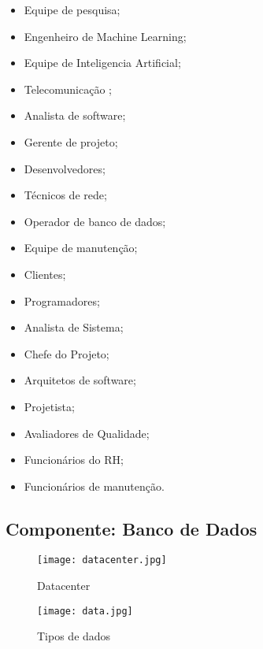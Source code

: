 \begin{itemize}

       \item Equipe de pesquisa;
       \item Engenheiro de Machine Learning;
       \item Equipe  de Inteligencia Artificial;
       \item Telecomunicação ;
       \item Analista de software;
       \item Gerente de projeto;
       \item Desenvolvedores;
       \item Técnicos de rede;
       \item Operador de banco de dados;
       \item Equipe de manutenção;
       \item Clientes;
       \item Programadores;
       \item Analista de Sistema;
       \item Chefe do Projeto;
       \item Arquitetos de software;
       \item Projetista;
       \item Avaliadores de Qualidade;
       \item   Funcionários  do RH;
       \item Funcionários de manutenção.

\end{itemize}
\subsection{Componente: Banco de Dados}

\begin{figure}[H]
       \begin{center}
              \texttt{[image: datacenter.jpg]}
              \caption{Datacenter} \label{sistema}
       \end{center}
\end{figure}

\begin{figure}[H]
       \begin{center}
              \texttt{[image: data.jpg]}
              \caption{Tipos de dados} \label{sistema}
       \end{center}
\end{figure}

